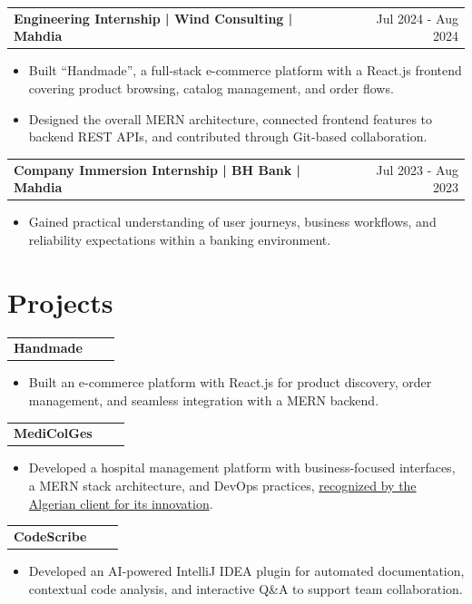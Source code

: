 \documentclass[a4paper,11pt]{article}
\makeatletter
\newenvironment{jobshort}[2]
    {
    \begin{tabularx}{\linewidth}{@{}l X r@{}}
    \textbf{#1} & \hfill &  #2 \\[2.75pt]
    \end{tabularx}
    \begin{minipage}[t]{\linewidth}
    \begin{itemize}[nosep,after=\strut, leftmargin=1em, itemsep=2pt]
    }
    {
    \end{itemize}
    \end{minipage}
    }
\makeatother
\begin{document}
\begin{jobshort}{Engineering Internship | Wind Consulting | Mahdia}{Jul 2024 - Aug 2024}
\item Built ``Handmade'', a full-stack e-commerce platform with a React.js frontend covering product browsing, catalog management, and order flows.
\item Designed the overall MERN architecture, connected frontend features to backend REST APIs, and contributed through Git-based collaboration.
\end{jobshort}

\begin{jobshort}{Company Immersion Internship | BH Bank | Mahdia}{Jul 2023 - Aug 2023}
\item Gained practical understanding of user journeys, business workflows, and reliability expectations within a banking environment.
\end{jobshort}

\section{Projects}

\begin{jobshort}{Handmade}{}
\item Built an e-commerce platform with React.js for product discovery, order management, and seamless integration with a MERN backend.
\end{jobshort}
\vspace{-1pt}
\begin{jobshort}{MediColGes}{}
\item Developed a hospital management platform with business-focused interfaces, a MERN stack architecture, and DevOps practices, \href{https://drive.google.com/file/d/1gWNv6cd-rV3e9UC0t1IIyUFB63efAkBR/view}{recognized by the Algerian client for its innovation}.
\end{jobshort}
\vspace{-1pt}
\begin{jobshort}{CodeScribe}{}
\item Developed an AI-powered IntelliJ IDEA plugin for automated documentation, contextual code analysis, and interactive Q\&A to support team collaboration.
\end{jobshort}

\vspace{-8pt}
\end{document}
